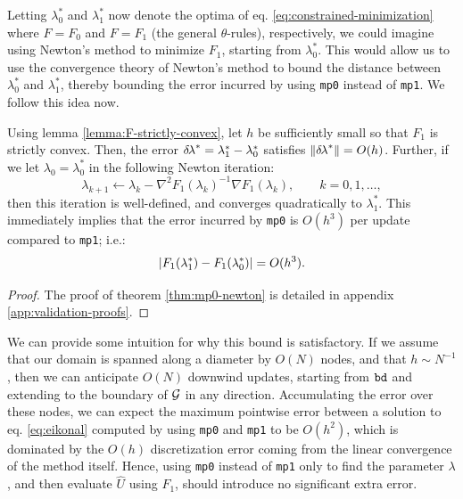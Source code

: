 \documentclass[smallcondensed]{svjour3}
\begin{document}
Letting $\lambda_0^*$ and $\lambda_1^*$ now denote the optima of eq.\@
\ref{eq:constrained-minimization} where $F = F_0$ and $F = F_1$ (the
general $\theta$-rules), respectively, we could imagine using Newton's
method to minimize $F_1$, starting from $\lambda_0^*$. This would
allow us to use the convergence theory of Newton's method to bound the
distance between $\lambda_0^*$ and $\lambda_1^*$, thereby bounding the
error incurred by using \texttt{mp0} instead of \texttt{mp1}. We
follow this idea now.

\begin{theorem}\label{thm:mp0-newton}
  Using lemma \ref{lemma:F-strictly-convex}, let $h$ be sufficiently
  small so that $F_1$ is strictly convex. Then, the error
  ${\delta \hspace{-0.1em} \lambda}^* = \lambda_1^* - \lambda_0^*$ satisfies
  $\left\|{\delta \hspace{-0.1em} \lambda}^*\right\| = O(h)$. Further, if we let
  $\lambda_0 = \lambda_0^*$ in the following Newton iteration:
  \begin{equation}
    \label{eq:lam0-iter-to-lam1}
    \lambda_{k+1} \gets \lambda_k - \nabla^2 F_1(\lambda_k)^{-1} \nabla F_1(\lambda_k), \qquad k = 0, 1, \hdots,
  \end{equation}
  then this iteration is well-defined, and converges quadratically to
  $\lambda_1^*$. This immediately implies that the error incurred by
  \texttt{mp0} is $O(h^3)$ per update compared to \texttt{mp1}; i.e.:
  \begin{equation}
    \label{eq:mp0-error}
    \left|F_1(\lambda_1^*) - F_1(\lambda_0^*)\right| = O(h^3).
  \end{equation}
\end{theorem}

\begin{proof}
  The proof of theorem \ref{thm:mp0-newton} is detailed in appendix
  \ref{app:validation-proofs}.
\end{proof}

We can provide some intuition for why this bound is satisfactory. If
we assume that our domain is spanned along a diameter by $O(N)$ nodes,
and that $h \sim N^{-1}$, then we can anticipate $O(N)$ downwind
updates, starting from $\texttt{bd}$ and extending to the boundary of
$\mathcal{G}$ in any direction. Accumulating the error over these nodes, we
can expect the maximum pointwise error between a solution to eq.\@
\ref{eq:eikonal} computed by using \texttt{mp0} and \texttt{mp1} to be
$O(h^2)$, which is dominated by the $O(h)$ discretization error coming
from the linear convergence of the method itself. Hence, using
\texttt{mp0} instead of \texttt{mp1} only to find the parameter
$\lambda$, and then evaluate $\hat{U}$ using $F_1$, should introduce
no significant extra error.
\end{document}
